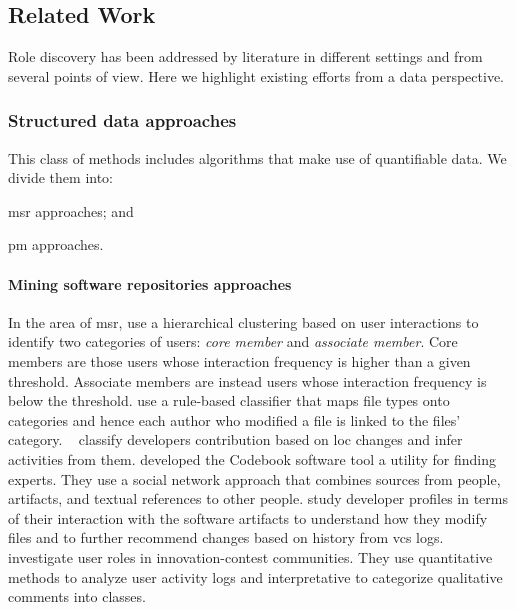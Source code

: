 \subsection{Related Work}
Role discovery has been addressed by literature in different settings and from several points of view. Here we highlight existing efforts from a data perspective.

\subsubsection{Structured data approaches}
This class of methods includes algorithms that make use of quantifiable data. We divide them into: 
\begin{inparaenum}[\itshape a)]
   \item \gls*{msr} approaches; and
   \item \gls*{pm} approaches.
\end{inparaenum}

\paragraph{\bfseries Mining software repositories approaches}
In the area of \gls*{msr}, \citep{Yu.LiguoRamaswamy.2007} use a hierarchical clustering based on user interactions to identify two categories of users: \emph{core member} and \emph{associate member}. Core members are those users whose interaction frequency is higher than a given threshold. Associate members are instead users whose interaction frequency is below the threshold.
\citep{Alonso2008} use a rule-based classifier that maps file types onto categories and hence each author who modified a file is linked to the files' category. ~\citep{gousios2008measuring} classify developers contribution based on \gls*{loc} changes and infer activities from them. \citep{Begel2010} developed the Codebook software tool a utility for finding experts. They use a social network approach that combines sources from people, artifacts, and textual references to other people. 
\cite{Ying2014} study developer profiles in terms of their interaction with the software artifacts to understand how they modify files and to further recommend changes based on history from \gls*{vcs} logs. \citep{Fuller2014a} investigate user roles in innovation-contest communities. They use quantitative methods to analyze user activity logs and interpretative to categorize qualitative comments into classes. 

